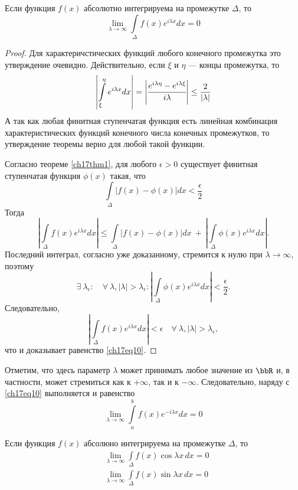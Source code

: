 \begin{thm} \label{ch17thm2}
Если функция $f(x)$ абсолютно интегрируема на промежутке $\Delta$, то
\begin{equation} \label{ch17eq10}
\lim_{\lambda \to \infty}\int\limits_{\Delta} f(x)e^{i\lambda x}dx = 0
\end{equation}
\end{thm}
\begin{proof}
Для характеричстических функций любого конечного промежутка это утверждение очевидно. Действительно, если $\xi$ и $\eta$ --- концы промежутка, то
$$
\left|\int\limits_{\xi}^{\eta} e^{i\lambda x}dx\right| = \left|\cfrac{e^{i\lambda \eta} - e^{i\lambda \xi}}{i\lambda}\right| \le \frac{2}{|\lambda|}
$$
А так как любая финитная ступенчатая функция есть линейная комбинация характеристических функций конечного числа конечных промежутков, то утверждение теоремы верно для любой такой функции.

Согласно теореме \eqref{ch17thm1}, для любого $\epsilon > 0$ существует финитная ступенчатая функция $\phi(x)$ такая, что
$$
\int\limits_{\Delta} |f(x) - \phi(x)|dx < \frac{\epsilon}{2}
$$
Тогда
$$
\left|\int\limits_{\Delta} f(x)e^{i\lambda x}dx\right| \le \int\limits_{\Delta} |f(x) - \phi(x)|dx\ +\ \left|\int\limits_{\Delta} \phi(x)e^{i\lambda x}dx\right|.
$$
Последний интеграл, согласно уже доказанному, стремится к нулю при $\lambda \to \infty$, поэтому
$$
\exists\ \lambda_{\epsilon} : \quad \forall\ \lambda, |\lambda| > \lambda_{\epsilon} : \left|\int\limits_{\Delta} \phi(x)e^{i\lambda x}dx\right| < \frac{\epsilon}{2}.
$$
Следовательно,
$$
\left|\int\limits_{\Delta} f(x)e^{i\lambda x}dx\right| < \epsilon \quad \forall\ \lambda, |\lambda| > \lambda_{\epsilon},
$$
что и доказывает равенство \eqref{ch17eq10}.
\end{proof}

Отметим, что здесь параметр $\lambda$ может принимать любое значение из $\bbR$ и, в частности, может стремиться как к $+\infty$, так и к $-\infty$. Следовательно, наряду с \eqref{ch17eq10} выполняется и равенство
$$
\lim_{\lambda \to \infty}\int\limits_{a}^{b} f(x)e^{-i\lambda x}dx = 0
$$

\begin{cons}
Если функция $f(x)$ абсолюно интегрируема на промежутке $\Delta$, то
\begin{align*}
&\lim_{\lambda \to \infty}\int\limits_{\Delta} f(x)\cos{\lambda x}\,dx = 0\\
&\lim_{\lambda \to \infty}\int\limits_{\Delta} f(x)\sin{\lambda x}\,dx = 0
\end{align*}
\end{cons}

